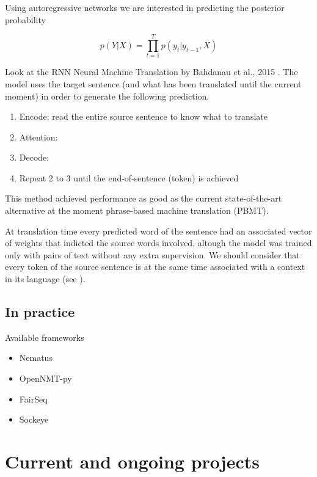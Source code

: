 \documentclass[b5paper]{report}
\begin{document}
Using autoregressive networks we are interested in predicting the posterior
probability

\begin{equation}
  p(Y|X) = \prod_{t=1}^T p(y_t|y_{t-1}, X)
\end{equation}

Look at the RNN Neural Machine Translation by Bahdanau et al., 2015
\cite{bahdanau2014neural}. The model uses the target sentence (and what has
been translated until the current moment) in order to generate the following
prediction.

\begin{enumerate}
  \item Encode: read the entire source sentence to know what to translate
  \item Attention:
  \item Decode:
  \item Repeat 2 to 3 until the end-of-sentence (token) is achieved
\end{enumerate}

This method achieved performance as good as the current state-of-the-art
alternative at the moment phrase-based machine translation (PBMT).

At translation time every predicted word of the sentence had an associated
vector of weights that indicted the source words involved, altough the model
was trained only with pairs of text without any extra supervision. We should
consider that every token of the source sentence is at the same time associated
with a context in its language (see \cite{jean2015montreal}).

\subsection{In practice}

Available frameworks

\begin{itemize}
  \item Nematus \cite{sennrich2017nematus}
  \item OpenNMT-py \cite{opennmt}
  \item FairSeq \cite{gehring2017convs2s}
  \item Sockeye \cite{Sockeye:17}
\end{itemize}

\section{Current and ongoing projects}
\end{document}
